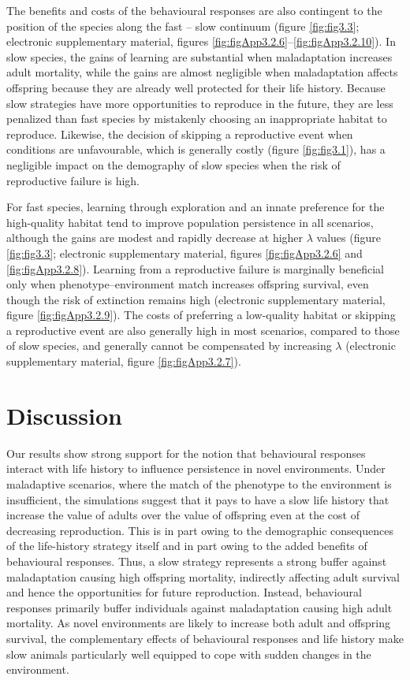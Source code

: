 The benefits and costs of the behavioural responses are
also contingent to the position of the species along the fast –
slow continuum (figure \ref{fig:fig3.3}; electronic supplementary material,
figures \ref{fig:figApp3.2.6}–\ref{fig:figApp3.2.10}). In slow species, the gains of learning are substantial
when maladaptation increases adult mortality, while
the gains are almost negligible when maladaptation affects offspring
because they are already well protected for their life
history. Because slow strategies have more opportunities to
reproduce in the future, they are less penalized than fast
species by mistakenly choosing an inappropriate habitat to
reproduce. Likewise, the decision of skipping a reproductive
event when conditions are unfavourable, which is generally
costly (figure \ref{fig:fig3.1}), has a negligible impact on the demography
of slow species when the risk of reproductive failure is high.

For fast species, learning through exploration and an innate
preference for the high-quality habitat tend to improve population
persistence in all scenarios, although the gains are
modest and rapidly decrease at higher $\lambda$ values (figure \ref{fig:fig3.3}; electronic
supplementary material, figures \ref{fig:figApp3.2.6} and \ref{fig:figApp3.2.8}). Learning
from a reproductive failure is marginally beneficial only when
phenotype–environment match increases offspring survival,
even though the risk of extinction remains high (electronic
supplementary material, figure \ref{fig:figApp3.2.9}). The costs of preferring a
low-quality habitat or skipping a reproductive event are also
generally high in most scenarios, compared to those of slow
species, and generally cannot be compensated by increasing
$\lambda$ (electronic supplementary material, figure \ref{fig:figApp3.2.7}).


\section{Discussion}

Our results show strong support for the notion that behavioural
responses interact with life history to influence persistence in
novel environments. Under maladaptive scenarios, where the
match of the phenotype to the environment is insufficient,
the simulations suggest that it pays to have a slow life history
that increase the value of adults over the value of offspring
even at the cost of decreasing reproduction. This is in part
owing to the demographic consequences of the life-history
strategy itself and in part owing to the added benefits of behavioural
responses. Thus, a slow strategy represents a strong
buffer against maladaptation causing high offspring mortality,
indirectly affecting adult survival and hence the opportunities
for future reproduction. Instead, behavioural responses primarily
buffer individuals against maladaptation causing high
adult mortality. As novel environments are likely to increase
both adult and offspring survival, the complementary effects
of behavioural responses and life history make slow animals
particularly well equipped to cope with sudden changes in
the environment.

